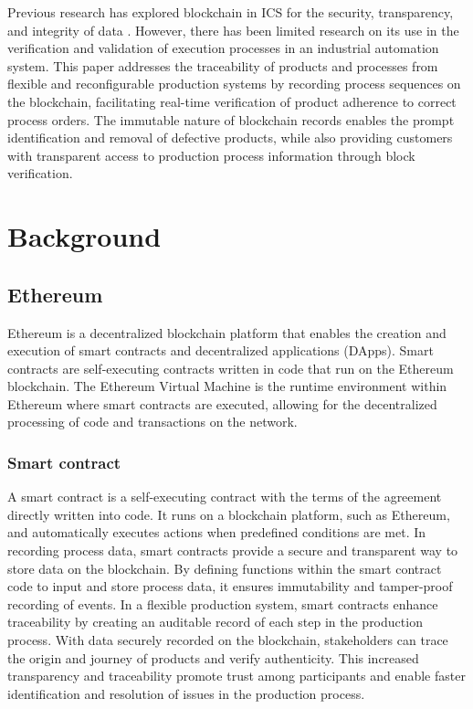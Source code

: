 \documentclass[conference]{IEEEtran}
\begin{document}
Previous research has explored blockchain in ICS for the security, transparency, and integrity of data \cite{schorradt2019feasibility, stodt2021security}. However, there has been limited research on its use in the verification and validation of execution processes in an industrial automation system. This paper addresses the traceability of products and processes from flexible and reconfigurable production systems by recording process sequences on the blockchain, facilitating real-time verification of product adherence to correct process orders. The immutable nature of blockchain records enables the prompt identification and removal of defective products, while also providing customers with transparent access to production process information through block verification.

\section{Background}
\label{sec:background}

\subsection{Ethereum}
\label{ethereum}
Ethereum \cite{buterin2014nextgeneration} is a decentralized blockchain platform that enables the creation and execution of smart contracts and decentralized applications (DApps). Smart contracts are self-executing contracts written in code that run on the Ethereum blockchain. The Ethereum Virtual Machine is the runtime environment within Ethereum where smart contracts are executed, allowing for the decentralized processing of code and transactions on the network.

\subsubsection{Smart contract}
\label{SC}
A smart contract \cite{oliva2020exploratory} is a self-executing contract with the terms of the agreement directly written into code. It runs on a blockchain platform, such as Ethereum, and automatically executes actions when predefined conditions are met. In recording process data, smart contracts provide a secure and transparent way to store data on the blockchain. By defining functions within the smart contract code to input and store process data, it ensures immutability and tamper-proof recording of events. In a flexible production system, smart contracts enhance traceability by creating an auditable record of each step in the production process. With data securely recorded on the blockchain, stakeholders can trace the origin and journey of products and verify authenticity. This increased transparency and traceability promote trust among participants and enable faster identification and resolution of issues in the production process.
\end{document}
